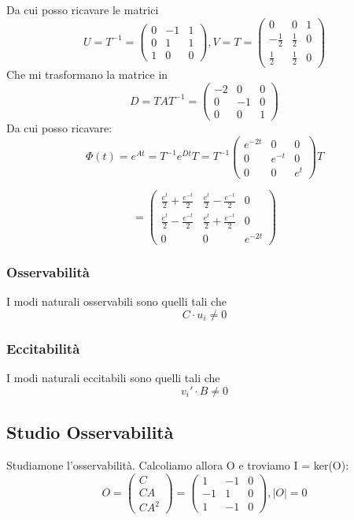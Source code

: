 \documentclass{article}
\begin{document}
Da cui posso ricavare le matrici \[U=T^{-1} = \left(\begin{matrix}0 & -1 & 1\\0 & 1 & 1\\1 & 0 & 0\end{matrix}\right), V = T = \left(\begin{matrix}0 & 0 & 1\\- \frac{1}{2} & \frac{1}{2} & 0\\\frac{1}{2} & \frac{1}{2} & 0\end{matrix}\right)\]
Che mi trasformano la matrice in \[ D = TAT^{-1} = \left(\begin{matrix}-2 & 0 & 0\\0 & -1 & 0\\0 & 0 & 1\end{matrix}\right) \]
Da cui posso ricavare: \[ \Phi(t) = e^{At} = T^{-1} e^{Dt} T =  T^{-1} \left(\begin{matrix}e^{- 2 t} & 0 & 0\\0 & e^{- t} & 0\\0 & 0 & e^{t}\end{matrix}\right) T\]

\[ = \left(\begin{matrix}\frac{e^{t}}{2} + \frac{e^{- t}}{2} & \frac{e^{t}}{2} - \frac{e^{- t}}{2} & 0\\\frac{e^{t}}{2} - \frac{e^{- t}}{2} & \frac{e^{t}}{2} + \frac{e^{- t}}{2} & 0\\0 & 0 & e^{- 2 t}\end{matrix}\right) \]\subsubsection{Osservabilità}
 I modi naturali osservabili sono quelli tali che 
\[ C \cdot u_i   \neq 0\]
\subsubsection{Eccitabilità}
 I modi naturali eccitabili sono quelli tali che 
\[v_i' \cdot B \neq 0\]

\subsection{Studio Osservabilità}

Studiamone l’osservabilità. Calcoliamo allora O e troviamo I = ker(O):
\[
 O = \begin{pmatrix}C \\ CA \\ CA^2 \end{pmatrix} = \left(\begin{matrix}1 & -1 & 0\\-1 & 1 & 0\\1 & -1 & 0\end{matrix}\right), |O| = 0 \]
\end{document}
